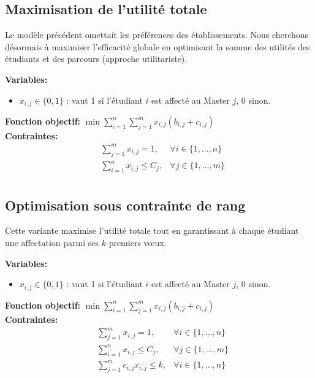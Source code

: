 \documentclass{article}
\begin{document}
\subsection{Maximisation de l'utilité totale}

Le modèle précédent omettait les préférences des établissements. Nous cherchons désormais à 
maximiser l'efficacité globale en optimisant la somme des utilités des étudiants et des parcours 
(approche utilitariste).

\textbf{Variables:}
\begin{itemize}
    \item $x_{i,j} \in \{0, 1\}$ : vaut 1 si l'étudiant $i$ est affecté au Master $j$, 0 sinon.
\end{itemize}
\textbf{Fonction objectif:} $\min \sum_{i=1}^n \sum_{j=1}^m x_{i,j} (b_{i,j}+c_{i,j})$ \\
\textbf{Contraintes:}
\begin{align*}
    & \sum_{j=1}^{m} x_{i,j} = 1, & \forall i \in \{1, \dots, n\} \\
    & \sum_{i=1}^{n} x_{i,j} \le C_j, & \forall j \in \{1, \dots, m\} \\
\end{align*}

\subsection{Optimisation sous contrainte de rang}

Cette variante maximise l'utilité totale tout en garantissant à chaque étudiant une affectation 
parmi ses $k$ premiers vœux. 

\textbf{Variables:}
\begin{itemize}
    \item $x_{i,j} \in \{0, 1\}$ : vaut 1 si l'étudiant $i$ est affecté au Master $j$, 0 sinon.
\end{itemize}
\textbf{Fonction objectif:} $\min \sum_{i=1}^n \sum_{j=1}^m x_{i,j} (b_{i,j}+c_{i,j})$ \\
\textbf{Contraintes:}
\begin{align*}
    & \sum_{j=1}^{m} x_{i,j} = 1, & \forall i \in \{1, \dots, n\} \\
    & \sum_{i=1}^{n} x_{i,j} \le C_j, & \forall j \in \{1, \dots, m\} \\
    & \sum_{j=1}^{m} c_{i,j} x_{i,j} \leq k, & \forall i \in \{1, \dots, n\} \\
\end{align*}
\end{document}
